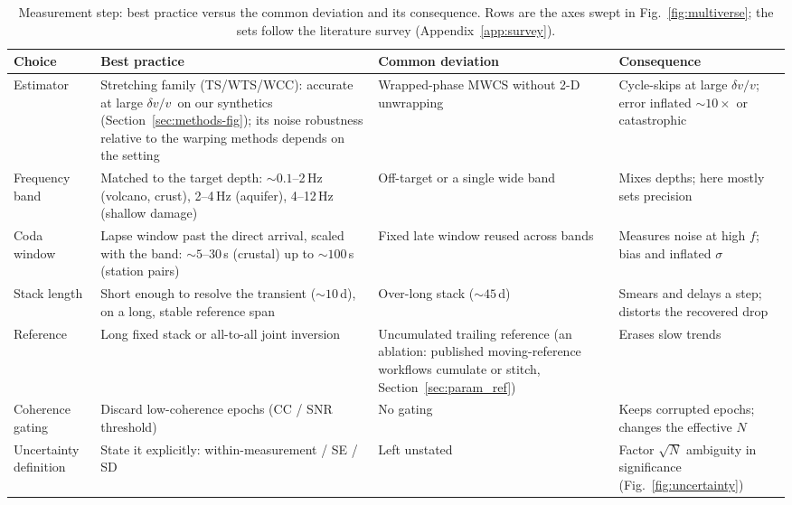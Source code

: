 \documentclass[
  referee]{gji}
\providecommand{\dvv}{\ensuremath{\delta v/v}}
\begin{document}
\begin{table}
\footnotesize
\caption{Measurement step: best practice versus the common deviation and its
consequence. Rows are the axes swept in Fig.~\ref{fig:multiverse}; the sets
follow the literature survey (Appendix~\ref{app:survey}).}
\label{tab:bp-measure}
\begin{tabularx}{\textwidth}{@{}>{\raggedright\arraybackslash}p{2.5cm} L L L@{}}
\toprule
\textbf{Choice} & \textbf{Best practice} & \textbf{Common deviation} &
\textbf{Consequence} \\
\midrule
Estimator & Stretching family (TS/WTS/WCC): accurate at large \dvv\ on our synthetics (Section~\ref{sec:methods-fig}); its noise robustness relative to the warping methods depends on the setting \citep{Mikesell2015,Yuan2021} & Wrapped-phase MWCS \citep{Clarke2011} without 2-D
unwrapping \citep{Mao2020} & Cycle-skips at large \dvv; error inflated
$\sim\!10\times$ or catastrophic \\ \hline
Frequency band & Matched to the target depth: $\sim\!0.1$--2\,Hz (volcano, crust),
2--4\,Hz (aquifer), 4--12\,Hz (shallow damage) \citep{Obermann2013,Obermann2016} &
Off-target or a single wide band & Mixes depths; here mostly sets precision \\ \hline
Coda window & Lapse window past the direct arrival, scaled with the band:
$\sim\!5$--30\,s (crustal) up to $\sim\!100$\,s (station pairs) \citep{Obermann2013} &
Fixed late window reused across bands & Measures noise at high $f$; bias and
inflated $\sigma$ \\ \hline
Stack length & Short enough to resolve the transient ($\sim\!10$\,d), on a long,
stable reference span \citep{Wang2017} & Over-long stack ($\sim\!45$\,d) & Smears and
delays a step; distorts the recovered drop \\ \hline
Reference & Long fixed stack or all-to-all joint inversion
\citep{Brenguier2014,Wang2017} & Uncumulated trailing reference (an ablation:
published moving-reference workflows cumulate or stitch,
Section~\ref{sec:param_ref}) & Erases slow trends \\ \hline
Coherence gating & Discard low-coherence epochs (CC / SNR threshold)
\citep{Clarke2011} & No gating & Keeps corrupted epochs; changes the effective $N$ \\ \hline
Uncertainty definition & State it explicitly: within-measurement
\citep{Weaver2011,Clarke2011} / SE / SD & Left unstated & Factor $\sqrt{N}$
ambiguity in significance (Fig.~\ref{fig:uncertainty}) \\
\bottomrule
\end{tabularx}
\end{table}
\end{document}
